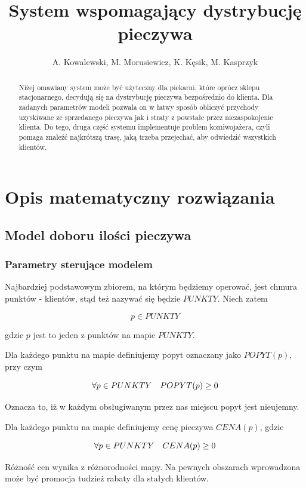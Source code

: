 \documentclass[]{article}
\title{System wspomagający dystrybucję pieczywa}
\author{A. Kowalewski, M. Morusiewicz, K. Kęsik, M. Kasprzyk}
\begin{document}
\maketitle

\begin{abstract}
Niżej omawiany system może być użyteczny dla piekarni, które oprócz sklepu stacjonarnego, decydują się na dystrybucję pieczywa bezpośrednio do klienta. Dla zadanych parametrów modeli pozwala on w łatwy sposób obliczyć przychody uzyskiwane ze sprzedanego pieczywa jak i straty z powstałe przez niezaspokojenie klienta. Do tego, druga część systemu implementuje problem komiwojażera, czyli pomaga znaleźć najkrótszą trasę, jaką trzeba przejechać, aby odwiedzić wszystkich klientów.
\end{abstract}

\section{Opis matematyczny rozwiązania}

\subsection{Model doboru ilości pieczywa}

\subsubsection{Parametry sterujące modelem}

Najbardziej podstawowym zbiorem, na którym będziemy operować, jest chmura punktów - klientów, stąd też nazywać się będzie $PUNKTY$. Niech zatem

\[ p \in PUNKTY \]

gdzie $p$ jest to jeden z punktów na mapie $PUNKTY$. 

Dla każdego punktu na mapie definiujemy popyt oznaczany jako $POPYT(p)$, przy czym

\[ {\Large \forall} p \in PUNKTY \quad POPYT(p) \geq 0 \]

Oznacza to, iż w każdym obsługiwanym przez nas miejscu popyt jest nieujemny. 
	
Dla każdego punktu na mapie definiujemy cenę pieczywa $CENA(p)$, gdzie

\[ {\Large \forall} p \in PUNKTY \quad CENA(p) \geq 0 \]

Różność cen wynika z różnorodności mapy. Na pewnych obszarach wprowadzona może być promocja tudzież rabaty dla stałych klientów.
	
\end{document}
